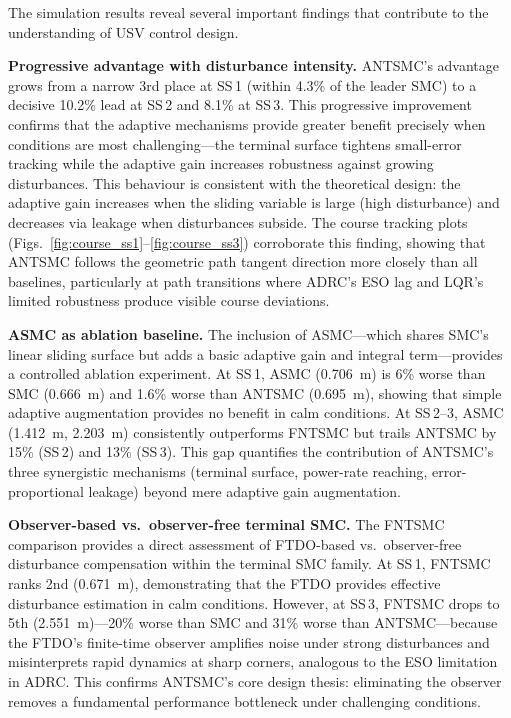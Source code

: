 \documentclass[review]{cas-dc}
\begin{document}
The simulation results reveal several important findings that contribute to the understanding of USV control design.

\textbf{Progressive advantage with disturbance intensity.} ANTSMC's advantage grows from a narrow 3rd place at SS\,1 (within 4.3\% of the leader SMC) to a decisive 10.2\% lead at SS\,2 and 8.1\% at SS\,3. This progressive improvement confirms that the adaptive mechanisms provide greater benefit precisely when conditions are most challenging---the terminal surface tightens small-error tracking while the adaptive gain increases robustness against growing disturbances. This behaviour is consistent with the theoretical design: the adaptive gain increases when the sliding variable is large (high disturbance) and decreases via leakage when disturbances subside. The course tracking plots (Figs.~\ref{fig:course_ss1}--\ref{fig:course_ss3}) corroborate this finding, showing that ANTSMC follows the geometric path tangent direction more closely than all baselines, particularly at path transitions where ADRC's ESO lag and LQR's limited robustness produce visible course deviations.

\textbf{ASMC as ablation baseline.} The inclusion of ASMC---which shares SMC's linear sliding surface but adds a basic adaptive gain and integral term---provides a controlled ablation experiment. At SS\,1, ASMC (0.706~m) is 6\% worse than SMC (0.666~m) and 1.6\% worse than ANTSMC (0.695~m), showing that simple adaptive augmentation provides no benefit in calm conditions. At SS\,2--3, ASMC (1.412~m, 2.203~m) consistently outperforms FNTSMC but trails ANTSMC by 15\% (SS\,2) and 13\% (SS\,3). This gap quantifies the contribution of ANTSMC's three synergistic mechanisms (terminal surface, power-rate reaching, error-proportional leakage) beyond mere adaptive gain augmentation.

\textbf{Observer-based vs.\ observer-free terminal SMC.} The FNTSMC comparison provides a direct assessment of FTDO-based vs.\ observer-free disturbance compensation within the terminal SMC family. At SS\,1, FNTSMC ranks 2nd (0.671~m), demonstrating that the FTDO provides effective disturbance estimation in calm conditions. However, at SS\,3, FNTSMC drops to 5th (2.551~m)---20\% worse than SMC and 31\% worse than ANTSMC---because the FTDO's finite-time observer amplifies noise under strong disturbances and misinterprets rapid dynamics at sharp corners, analogous to the ESO limitation in ADRC. This confirms ANTSMC's core design thesis: eliminating the observer removes a fundamental performance bottleneck under challenging conditions.
\end{document}
